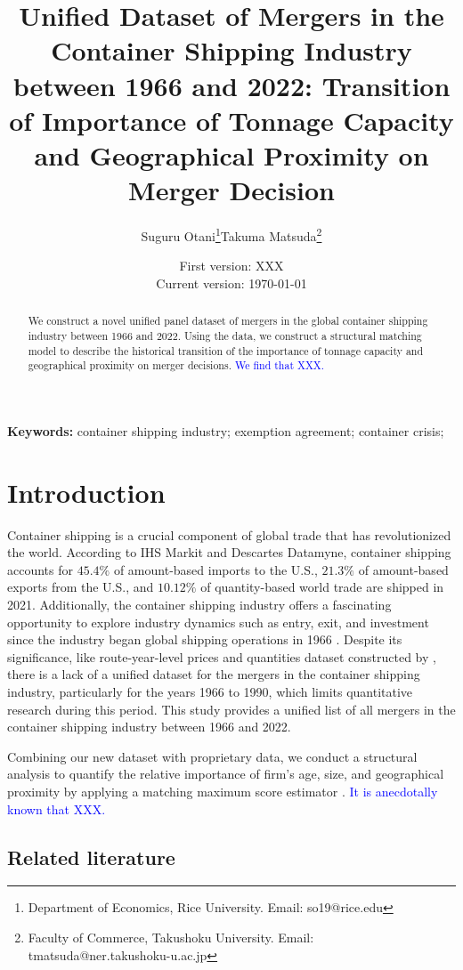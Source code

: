 \documentclass[10pt]{article}
\title{Unified Dataset of Mergers in the Container Shipping Industry between 1966 and 2022: Transition of Importance of Tonnage Capacity and Geographical Proximity on Merger Decision}
\author{Suguru Otani\thanks{Department of Economics, Rice University. Email: so19@rice.edu}\quad  Takuma Matsuda\thanks{Faculty of Commerce, Takushoku University. Email: tmatsuda@ner.takushoku-u.ac.jp}}
\date{
First version: XXX\\
Current version: \today
}
\begin{document}
\maketitle

\begin{abstract}
We construct a novel unified panel dataset of mergers in the global container shipping industry between 1966 and 2022. Using the data, we construct a structural matching model \citep{fox2018qe} to describe the historical transition of the importance of tonnage capacity and geographical proximity on merger decisions. 
\textcolor{blue}{We find that XXX.}
\end{abstract} 

\vspace{0.1in}
\noindent\textbf{Keywords:} container shipping industry; exemption agreement; container crisis; 
\vspace{0in}


\section{Introduction}

Container shipping is a crucial component of global trade that has revolutionized the world. 
According to IHS Markit and Descartes Datamyne, container shipping accounts for $45.4 \%$ of amount-based imports to the U.S., $21.3 \%$ of amount-based exports from the U.S., and $10.12 \%$ of quantity-based world trade are shipped in 2021. 
Additionally, the container shipping industry offers a fascinating opportunity to explore industry dynamics such as entry, exit, and investment since the industry began global shipping operations in 1966 \citep{otani2023industry}. 
Despite its significance, like route-year-level prices and quantities dataset constructed by \cite{matsuda2022unified}, there is a lack of a unified dataset for the mergers in the container shipping industry, particularly for the years 1966 to 1990, which limits quantitative research during this period. 
This study provides a unified list of all mergers in the container shipping industry between 1966 and 2022.

Combining our new dataset with proprietary data, we conduct a structural analysis to quantify the relative importance of firm's age, size, and geographical proximity by applying a matching maximum score estimator \cite{fox2018qe}. 
\textcolor{blue}{It is anecdotally known that XXX. }



\subsection{Related literature}
\end{document}
